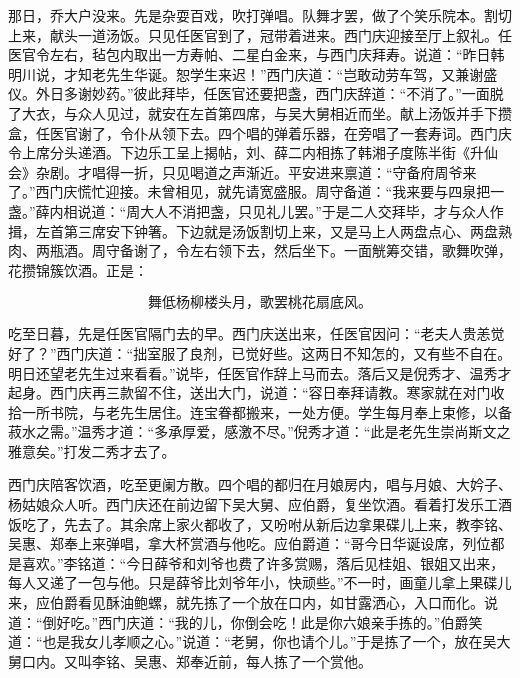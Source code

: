 那日，乔大户没来。先是杂耍百戏，吹打弹唱。队舞才罢，做了个笑乐院本。割切上来，献头一道汤饭。只见任医官到了，冠带着进来。西门庆迎接至厅上叙礼。任医官令左右，毡包内取出一方寿帕、二星白金来，与西门庆拜寿。说道：“昨日韩明川说，才知老先生华诞。恕学生来迟！”西门庆道：“岂敢动劳车驾，又兼谢盛仪。外日多谢妙药。”彼此拜毕，任医官还要把盏，西门庆辞道：“不消了。”一面脱了大衣，与众人见过，就安在左首第四席，与吴大舅相近而坐。献上汤饭并手下攒盒，任医官谢了，令仆从领下去。四个唱的弹着乐器，在旁唱了一套寿词。西门庆令上席分头递酒。下边乐工呈上揭帖，刘、薛二内相拣了韩湘子度陈半街《升仙会》杂剧。才唱得一折，只见喝道之声渐近。平安进来禀道：“守备府周爷来了。”西门庆慌忙迎接。未曾相见，就先请宽盛服。周守备道：“我来要与四泉把一盏。”薛内相说道：“周大人不消把盏，只见礼儿罢。”于是二人交拜毕，才与众人作揖，左首第三席安下钟箸。下边就是汤饭割切上来，又是马上人两盘点心、两盘熟肉、两瓶酒。周守备谢了，令左右领下去，然后坐下。一面觥筹交错，歌舞吹弹，花攒锦簇饮酒。正是：

\[
舞低杨柳楼头月，歌罢桃花扇底风。
\]

吃至日暮，先是任医官隔门去的早。西门庆送出来，任医官因问：“老夫人贵恙觉好了？”西门庆道：“拙室服了良剂，已觉好些。这两日不知怎的，又有些不自在。明日还望老先生过来看看。”说毕，任医官作辞上马而去。落后又是倪秀才、温秀才起身。西门庆再三款留不住，送出大门，说道：“容日奉拜请教。寒家就在对门收拾一所书院，与老先生居住。连宝眷都搬来，一处方便。学生每月奉上束修，以备菽水之需。”温秀才道：“多承厚爱，感激不尽。”倪秀才道：“此是老先生崇尚斯文之雅意矣。”打发二秀才去了。

西门庆陪客饮酒，吃至更阑方散。四个唱的都归在月娘房内，唱与月娘、大妗子、杨姑娘众人听。西门庆还在前边留下吴大舅、应伯爵，复坐饮酒。看着打发乐工酒饭吃了，先去了。其余席上家火都收了，又吩咐从新后边拿果碟儿上来，教李铭、吴惠、郑奉上来弹唱，拿大杯赏酒与他吃。应伯爵道：“哥今日华诞设席，列位都是喜欢。”李铭道：“今日薛爷和刘爷也费了许多赏赐，落后见桂姐、银姐又出来，每人又递了一包与他。只是薛爷比刘爷年小，快顽些。”不一时，画童儿拿上果碟儿来，应伯爵看见酥油鲍螺，就先拣了一个放在口内，如甘露洒心，入口而化。说道：“倒好吃。”西门庆道：“我的儿，你倒会吃！此是你六娘亲手拣的。”伯爵笑道：“也是我女儿孝顺之心。”说道：“老舅，你也请个儿。”于是拣了一个，放在吴大舅口内。又叫李铭、吴惠、郑奉近前，每人拣了一个赏他。

